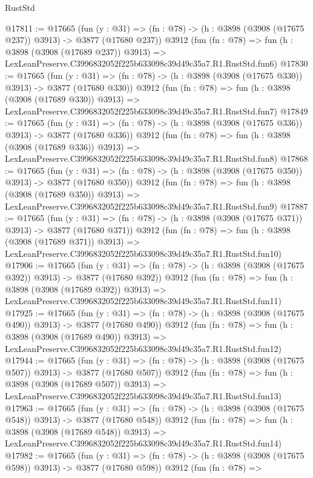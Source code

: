 \begin{lexlean}{RustStd}
\begin{coremodule}
@17811 := @17665
    (fun (y : @31) => (fn : @78) -> (h : @3898 (@3908 (@17675 @237)) @3913) -> @3877 (@17680 @237))
    @3912
    (fun (fn : @78) =>
    fun (h : @3898 (@3908 (@17689 @237)) @3913) =>
    LexLeanPreserve.C3996832052f225b633098c39d49c35a7.R1.RustStd.fun6)
@17830 := @17665
    (fun (y : @31) => (fn : @78) -> (h : @3898 (@3908 (@17675 @330)) @3913) -> @3877 (@17680 @330))
    @3912
    (fun (fn : @78) =>
    fun (h : @3898 (@3908 (@17689 @330)) @3913) =>
    LexLeanPreserve.C3996832052f225b633098c39d49c35a7.R1.RustStd.fun7)
@17849 := @17665
    (fun (y : @31) => (fn : @78) -> (h : @3898 (@3908 (@17675 @336)) @3913) -> @3877 (@17680 @336))
    @3912
    (fun (fn : @78) =>
    fun (h : @3898 (@3908 (@17689 @336)) @3913) =>
    LexLeanPreserve.C3996832052f225b633098c39d49c35a7.R1.RustStd.fun8)
@17868 := @17665
    (fun (y : @31) => (fn : @78) -> (h : @3898 (@3908 (@17675 @350)) @3913) -> @3877 (@17680 @350))
    @3912
    (fun (fn : @78) =>
    fun (h : @3898 (@3908 (@17689 @350)) @3913) =>
    LexLeanPreserve.C3996832052f225b633098c39d49c35a7.R1.RustStd.fun9)
@17887 := @17665
    (fun (y : @31) => (fn : @78) -> (h : @3898 (@3908 (@17675 @371)) @3913) -> @3877 (@17680 @371))
    @3912
    (fun (fn : @78) =>
    fun (h : @3898 (@3908 (@17689 @371)) @3913) =>
    LexLeanPreserve.C3996832052f225b633098c39d49c35a7.R1.RustStd.fun10)
@17906 := @17665
    (fun (y : @31) => (fn : @78) -> (h : @3898 (@3908 (@17675 @392)) @3913) -> @3877 (@17680 @392))
    @3912
    (fun (fn : @78) =>
    fun (h : @3898 (@3908 (@17689 @392)) @3913) =>
    LexLeanPreserve.C3996832052f225b633098c39d49c35a7.R1.RustStd.fun11)
@17925 := @17665
    (fun (y : @31) => (fn : @78) -> (h : @3898 (@3908 (@17675 @490)) @3913) -> @3877 (@17680 @490))
    @3912
    (fun (fn : @78) =>
    fun (h : @3898 (@3908 (@17689 @490)) @3913) =>
    LexLeanPreserve.C3996832052f225b633098c39d49c35a7.R1.RustStd.fun12)
@17944 := @17665
    (fun (y : @31) => (fn : @78) -> (h : @3898 (@3908 (@17675 @507)) @3913) -> @3877 (@17680 @507))
    @3912
    (fun (fn : @78) =>
    fun (h : @3898 (@3908 (@17689 @507)) @3913) =>
    LexLeanPreserve.C3996832052f225b633098c39d49c35a7.R1.RustStd.fun13)
@17963 := @17665
    (fun (y : @31) => (fn : @78) -> (h : @3898 (@3908 (@17675 @548)) @3913) -> @3877 (@17680 @548))
    @3912
    (fun (fn : @78) =>
    fun (h : @3898 (@3908 (@17689 @548)) @3913) =>
    LexLeanPreserve.C3996832052f225b633098c39d49c35a7.R1.RustStd.fun14)
@17982 := @17665
    (fun (y : @31) => (fn : @78) -> (h : @3898 (@3908 (@17675 @598)) @3913) -> @3877 (@17680 @598))
    @3912
    (fun (fn : @78) =>

\end{coremodule}
\end{lexlean}
